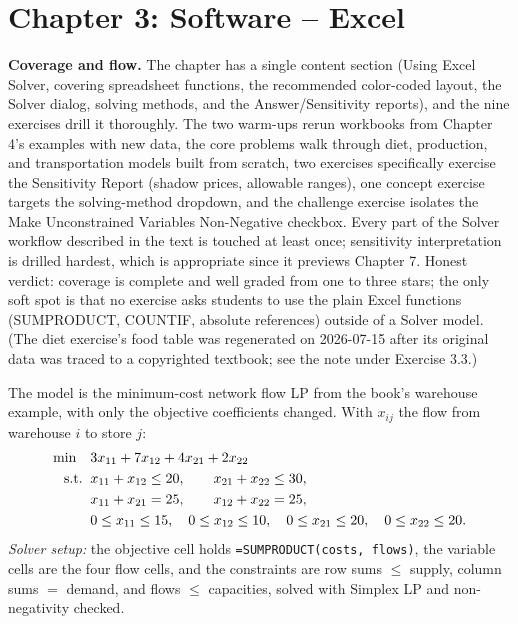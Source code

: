 \section{Chapter 3: Software -- Excel}

\textbf{Coverage and flow.} The chapter has a single content section (Using Excel Solver, covering spreadsheet functions, the recommended color-coded layout, the Solver dialog, solving methods, and the Answer/Sensitivity reports), and the nine exercises drill it thoroughly. The two warm-ups rerun workbooks from Chapter 4's examples with new data, the core problems walk through diet, production, and transportation models built from scratch, two exercises specifically exercise the Sensitivity Report (shadow prices, allowable ranges), one concept exercise targets the solving-method dropdown, and the challenge exercise isolates the Make Unconstrained Variables Non-Negative checkbox. Every part of the Solver workflow described in the text is touched at least once; sensitivity interpretation is drilled hardest, which is appropriate since it previews Chapter 7. Honest verdict: coverage is complete and well graded from one to three stars; the only soft spot is that no exercise asks students to use the plain Excel functions (SUMPRODUCT, COUNTIF, absolute references) outside of a Solver model. (The diet exercise's food table was regenerated on 2026-07-15 after its original data was traced to a copyrighted textbook; see the note under Exercise 3.3.)


The model is the minimum-cost network flow LP from the book's warehouse example, with only the objective coefficients changed. With $x_{ij}$ the flow from warehouse $i$ to store $j$:
\begin{align*}
\min \quad & 3x_{11} + 7x_{12} + 4x_{21} + 2x_{22}\\
\text{s.t.}\;\; & x_{11} + x_{12} \leq 20, \qquad x_{21} + x_{22} \leq 30,\\
& x_{11} + x_{21} = 25, \qquad x_{12} + x_{22} = 25,\\
& 0 \leq x_{11} \leq 15, \quad 0 \leq x_{12} \leq 10, \quad 0 \leq x_{21} \leq 20, \quad 0 \leq x_{22} \leq 20.
\end{align*}
\emph{Solver setup:} the objective cell holds \texttt{=SUMPRODUCT(costs, flows)}, the variable cells are the four flow cells, and the constraints are row sums $\leq$ supply, column sums $=$ demand, and flows $\leq$ capacities, solved with Simplex LP and non-negativity checked.

